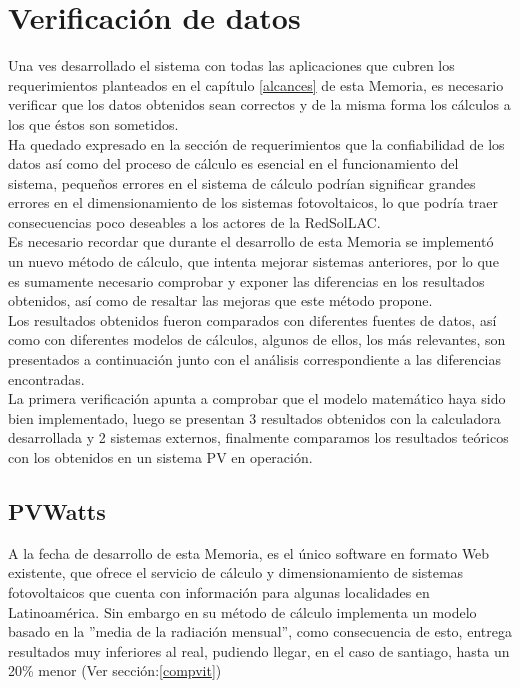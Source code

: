 \newpage
\section{Verificación de datos}
Una ves desarrollado el sistema con todas las aplicaciones que cubren los requerimientos planteados en el capítulo \ref{alcances} de esta Memoria, es necesario verificar que los datos obtenidos sean correctos y de la misma forma los cálculos a los que éstos son sometidos.\\
Ha quedado expresado en la sección de requerimientos que la confiabilidad de los datos así como del proceso de cálculo es esencial en el funcionamiento del sistema, pequeños errores en el sistema de cálculo podrían significar grandes errores en el dimensionamiento de los sistemas fotovoltaicos, lo que podría traer consecuencias poco deseables a los actores de la RedSolLAC.\\
Es necesario recordar que durante el desarrollo de esta Memoria se implementó un nuevo método de cálculo, que intenta mejorar sistemas anteriores, por lo que es sumamente necesario comprobar y exponer las diferencias en los resultados obtenidos, así como de resaltar las mejoras que este método propone.\\

Los resultados obtenidos fueron comparados con diferentes fuentes de datos, así como con diferentes modelos de cálculos, algunos de ellos, los más relevantes, son presentados a continuación junto con el análisis correspondiente a las diferencias encontradas.\\
La primera verificación apunta a comprobar que el modelo matemático haya sido bien implementado, luego se presentan 3 resultados obtenidos con la calculadora desarrollada y 2 sistemas externos, finalmente comparamos los resultados teóricos con los obtenidos en un sistema PV en operación.\\

\subsection{PVWatts}
A la fecha de desarrollo de esta Memoria, es el único software en formato Web existente, que ofrece el servicio de cálculo y dimensionamiento de sistemas fotovoltaicos que cuenta con información para algunas localidades en Latinoamérica. Sin embargo en su método de cálculo implementa un modelo basado en la ''media de la radiación mensual'', como consecuencia de esto, entrega resultados muy inferiores al real, pudiendo llegar, en el caso de santiago, hasta un 20\% menor (Ver sección:\ref{compvit})\\ 
